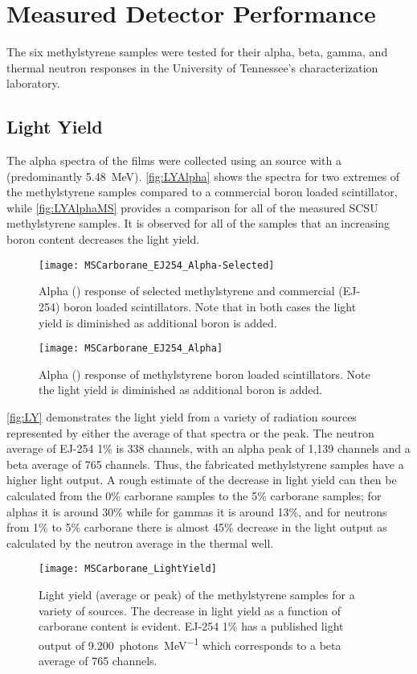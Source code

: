 \documentclass[draftcls,onecolumn]{IEEEtran}
\begin{document}
\section{Measured Detector Performance}
The six methylstyrene samples were tested for their alpha, beta, gamma, and thermal neutron responses in the University of Tennessee's characterization laboratory.

\subsection{Light Yield}

The alpha spectra of the films were collected using an  source with a (predominantly \SI{5.48}{\MeV}).
\autoref{fig:LYAlpha} shows the spectra for two extremes of the methylstyrene samples compared to a commercial boron loaded scintillator, while \autoref{fig:LYAlphaMS} provides a comparison for all of the measured SCSU methylstyrene samples. 
It is observed for all of the samples that an increasing boron content decreases the light yield.
\begin{figure}
  \centering
  \texttt{[image: MSCarborane\_EJ254\_Alpha-Selected]}
  \caption[Alpha Response of Selected Boron Loaded Samples]{Alpha () response of selected methylstyrene and commercial (EJ-254) boron loaded scintillators.  Note that in both cases the light yield is diminished as additional boron is added.}
  \label{fig:LYAlpha}
\end{figure}
\begin{figure}
  \centering
  \texttt{[image: MSCarborane\_EJ254\_Alpha]}
  \caption[Alpha Response of Methylstyrene Boron Loaded Samples]{Alpha () response of methylstyrene boron loaded scintillators.  Note the light yield is diminished as additional boron is added.}
  \label{fig:LYAlphaMS}
\end{figure}
\autoref{fig:LY} demonstrates the light yield from a variety of radiation sources represented by either the average of that spectra or the peak. 
The neutron average of EJ-254 1\% is 338 channels, with an alpha peak of 1,139 channels and a beta average of 765 channels.
Thus, the fabricated methylstyrene samples have a higher light output.
A rough estimate of the decrease in light yield can then be calculated from the 0\% carborane samples to the 5\% carborane samples; for alphas it is around 30\% while for  gammas it is around 13\%, and for neutrons from 1\% to 5\% carborane there is almost 45\% decrease in the light output as calculated by the neutron average in the thermal well.
\begin{figure}
  \centering
  \texttt{[image: MSCarborane\_LightYield]}
  \caption[Light Yield of Methylstyrene Carborane Samples]{Light yield (average or peak) of the methylstyrene samples for a variety of sources.  The decrease in light yield as a function of carborane content is evident. EJ-254 1\% has a published light output of \SI{9,200}{photons\per\MeV} which corresponds to a beta average of 765 channels.} 
  \label{fig:LY}
\end{figure}
\end{document}
